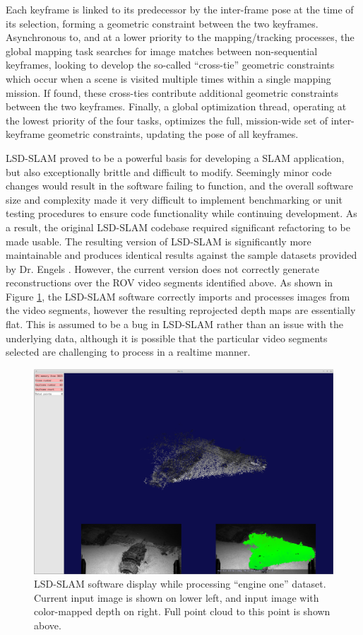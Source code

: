 \documentclass[letterpaper,12pt]{article}
\begin{document}
Each keyframe is linked to its predecessor by the inter-frame pose at the time of its selection, forming a geometric constraint between the two keyframes.   Asynchronous to, and at a lower priority to the mapping/tracking processes, the global mapping task searches for image matches between non-sequential keyframes, looking to develop the so-called ``cross-tie'' geometric constraints which occur when a scene is visited multiple times within a single mapping mission.   If found, these cross-ties contribute additional geometric constraints between the two keyframes.     Finally, a global optimization thread, operating at the lowest priority of the four tasks, optimizes the full, mission-wide set of inter-keyframe geometric constraints, updating the pose of all keyframes.   

LSD-SLAM proved to be a powerful basis for developing a SLAM application, but also exceptionally brittle and difficult to modify.  Seemingly minor code changes would result in the software failing to function, and the overall software size and complexity made it very difficult to implement benchmarking or unit testing procedures to ensure code functionality while continuing development.   As a result, the original LSD-SLAM codebase required significant refactoring to be made usable.  The resulting version of LSD-SLAM is significantly more maintainable and produces identical results against the sample datasets provided by Dr. Engels \cite{lsdslam}.   However, the current version does not correctly generate reconstructions over the ROV video segments identified above.  As shown in Figure \ref{fig:lsd_slam_engine}, the LSD-SLAM software correctly imports and processes images from the video segments, however the resulting reprojected depth maps are essentially flat.   This is assumed to be a bug in LSD-SLAM rather than an issue with the underlying data, although it is possible that the particular video segments selected are challenging to process in a realtime manner.

\begin{figure}
    \centering
    \includegraphics[width=\textwidth]{images/lsd_slam_engine_two.png}
    \caption{LSD-SLAM software display while processing ``engine one'' dataset.    Current input image is shown on lower left, and input image with color-mapped depth on right.   Full point cloud to this point is shown above.} 
    \label{fig:lsd_slam_engine}
\end{figure}
\end{document}
